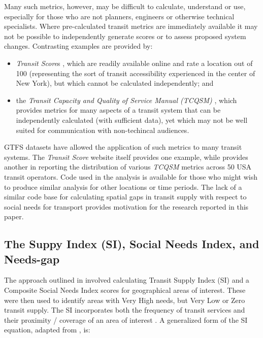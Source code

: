 \documentclass[preprint, 3p,
authoryear]{elsarticle} %
\begin{document}
Many such metrics, however, may be difficult to calculate, understand or
use, especially for those who are not planners, engineers or otherwise
technical specialists. Where pre-calculated transit metrics are
immediately available it may not be possible to independently generate
scores or to assess proposed system changes. Contrasting examples are
provided by:

\begin{itemize}
\item
  \emph{Transit Score}s \citep{WalkScore:2023tg}, which are readily
  available online and rate a location out of 100 (representing the sort
  of transit accessibility experienced in the center of New York), but
  which cannot be calculated independently; and
\item
  the \emph{Transit Capacity and Quality of Service Manual (TCQSM)}
  \citep{TCQSM:2013}, which provides metrics for many aspects of a
  transit system that can be independently calculated (with sufficient
  data), yet which may not be well suited for communication with
  non-techincal audiences.
\end{itemize}

GTFS datasets have allowed the application of such metrics to many
transit systems. The \emph{Transit Score} website itself provides one
example, while \citet{Wong:2013aa} provides another in reporting the
distribution of various \emph{TCQSM} metrics across 50 USA transit
operators. Code used in the \citet{Wong:2013aa} analysis is available
for those who might wish to produce similar analysis for other locations
or time periods. The lack of a similar code base for calculating spatial
gaps in transit supply with respect to social needs for transport
provides motivation for the research reported in this paper.

\subsection{The Suppy Index (SI), Social Needs Index, and
Needs-gap}\label{the-suppy-index-si-social-needs-index-and-needs-gap}

The approach outlined in \citet{currie2010identifying} involved
calculating Transit Supply Index (SI) and a Composite Social Needs Index
scores for geographical areas of interest. These were then used to
identify areas with Very High needs, but Very Low or Zero transit
supply. The SI incorporates both the frequency of transit services and
their proximity / coverage of an area of interest . A generalized form
of the SI equation, adapted from \citet{currie2010identifying}, is:
\end{document}

